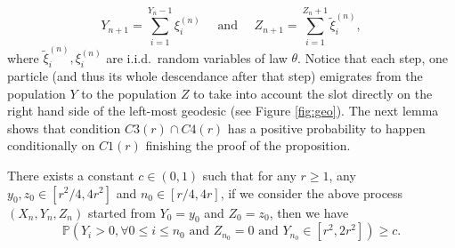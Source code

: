 \documentclass[10pt]{amsart}
\theoremstyle{definition}\newtheorem{defi}[theo]{Definition}\newtheorem{rema}[theo]{Remark}\newtheorem{exam}[theo]{Example}\newtheorem{exem}[theo]{Example}\newtheorem{nota}[theo]{Notation}
\begin{document}
$$ Y_{n+1} = \sum_{i=1}^{Y_{n}-1} \xi^{(n)}_{i} \quad \mbox{ and } \quad
Z_{n+1} = \sum_{i=1}^{Z_{n}+1} \tilde{\xi}^{(n)}_{i},$$
where $\tilde{\xi}^{(n)}_{i}, \xi^{{(n)}}_{i}$ are i.i.d.~random variables of law $\theta$. Notice that each step, one particle (and thus its whole descendance after that step) emigrates from the population $Y$ to the population $Z$ {to take into account the slot directly on the right hand side of the left-most geodesic (see Figure \ref{fig:geo})}. The next lemma shows that condition $C3(r) \cap C4(r)$ has a positive probability to happen conditionally on $C1(r)$ finishing the proof of the proposition.
\begin{lemma} \label{lem:immigration} There exists a constant $c \in (0,1)$ such that for any $r \geq 1$, any $y_{0},z_{0} \in [r^{2}/4, 4r^{2}]$ and $n_{0} \in [r/4, 4r]$, if we consider the above process $(X_{n},Y_{n},Z_{n})$ started from $Y_{0}=y_{0}$ and $Z_{0}=z_{0}$, then  we have
\[
\mathbb P\left( Y_{i}>0, \forall 0 \leq i \leq n_{0} \mbox{ and } Z_{n_{0}} = 0 \mbox{ and } Y_{n_{0}}  \in [r^{2}, 2 r^{2}] \right) \geq c.
\]
\end{lemma}
\end{document}
